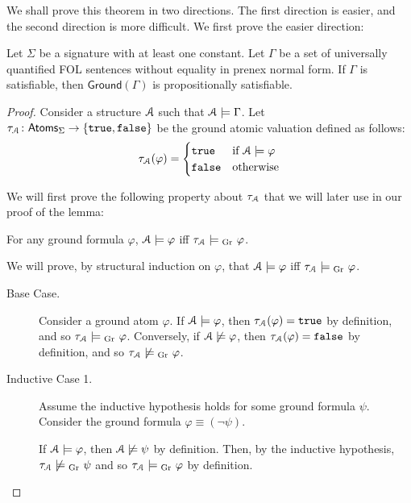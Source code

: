\documentclass[11pt,usenames, dvipsnames]{article}
\begin{document}
We shall prove this theorem in two directions. The first direction is easier, and the second direction is more difficult. We first prove the easier direction:

\begin{lemma}
  Let $\Sigma$ be a signature with at least one constant. Let $\Gamma$ be a set of universally quantified FOL sentences without equality in prenex normal form. If $\Gamma$ is satisfiable, then $\mathsf{Ground}(\Gamma)$ is propositionally satisfiable.
\end{lemma}

\begin{proof}
  Consider a structure $\struct$ such that $\struct \models \Gamma$. Let $\tau_\struct \colon \mathsf{Atoms}_\Sigma \to \{\truVal, \flsVal\}$ be the ground atomic valuation defined as follows:
  $$
  \tau_\struct(\varphi) = \begin{cases}
    \truVal &\text{if } \struct \models \varphi \\
    \flsVal &\text{otherwise}
  \end{cases}
  $$

  We will first prove the following property about $\tau_\struct$ that we will later use in our proof of the lemma: 
  \begin{claim}
    For any ground formula $\varphi$, $\struct \models \varphi$ iff $\tau_\struct \grmodels \varphi$.
  \end{claim}

  \begin{subproof}[Subproof.]
    We will prove, by structural induction on $\varphi$, that $\struct \models \varphi$ iff $\tau_\struct \grmodels \varphi$.

    \begin{description}
      \item[Base Case.] Consider a ground atom $\varphi$. If $\struct \models \varphi$, then $\tau_\struct(\varphi) = \truVal$ by definition, and so $\tau_\struct \grmodels \varphi$. Conversely, if $\struct \not\models \varphi$, then $\tau_\struct(\varphi) = \flsVal$ by definition, and so $\tau_\struct \not\grmodels \varphi$.

      \item[Inductive Case 1.] Assume the inductive hypothesis holds for some ground formula $\psi$. Consider the ground formula $\varphi \equiv (\neg \psi)$.
      
      If $\struct \models \varphi$, then $\struct \not\models \psi$ by definition. Then, by the inductive hypothesis, $\tau_\struct \not\grmodels \psi$ and so $\tau_\struct \grmodels \varphi$ by definition.
      

\end{description}
\end{subproof}
\end{proof}
\end{document}
